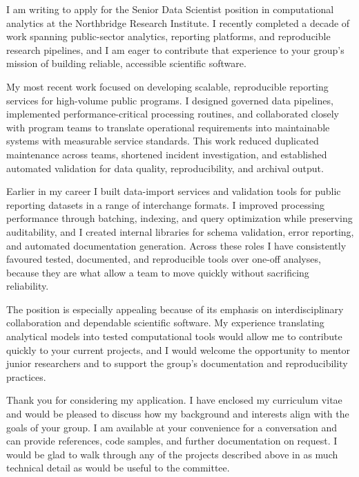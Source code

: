 \documentclass[medium=print]{careerdossier-letter}
\begin{document}
\MakeCDossierLetterhead

I am writing to apply for the Senior Data Scientist position in computational
analytics at the Northbridge Research Institute. I recently completed a decade
of work spanning public-sector analytics, reporting platforms, and reproducible
research pipelines, and I am eager to contribute that experience to your group's
mission of building reliable, accessible scientific software.

My most recent work focused on developing scalable, reproducible reporting
services for high-volume public programs. I designed governed data pipelines,
implemented performance-critical processing routines, and collaborated closely
with program teams to translate operational requirements into maintainable
systems with measurable service standards. This work reduced duplicated
maintenance across teams, shortened incident investigation, and established
automated validation for data quality, reproducibility, and archival output.

Earlier in my career I built data-import services and validation tools for
public reporting datasets in a range of interchange formats. I improved
processing performance through batching, indexing, and query optimization while
preserving auditability, and I created internal libraries for schema validation,
error reporting, and automated documentation generation. Across these roles I
have consistently favoured tested, documented, and reproducible tools over
one-off analyses, because they are what allow a team to move quickly without
sacrificing reliability.

The position is especially appealing because of its emphasis on interdisciplinary
collaboration and dependable scientific software. My experience translating
analytical models into tested computational tools would allow me to contribute
quickly to your current projects, and I would welcome the opportunity to mentor
junior researchers and to support the group's documentation and reproducibility
practices.

Thank you for considering my application. I have enclosed my curriculum vitae and
would be pleased to discuss how my background and interests align with the goals
of your group. I am available at your convenience for a conversation and can
provide references, code samples, and further documentation on request. I would
be glad to walk through any of the projects described above in as much technical
detail as would be useful to the committee.

\MakeCDossierClosing
\end{document}
